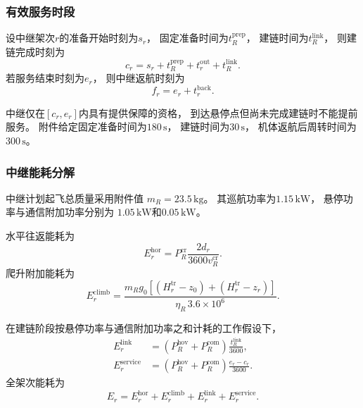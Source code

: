 \documentclass[bwprint]{gmcmthesis}
\begin{document}
\subsubsection{有效服务时段}

设中继架次$r$的准备开始时刻为$s_r$，
固定准备时间为$t_R^{\mathrm{prep}}$，
建链时间为$t_R^{\mathrm{link}}$，
则建链完成时刻为
\begin{equation}
    c_r
    =
    s_r+t_R^{\mathrm{prep}}
    +t_r^{\mathrm{out}}
    +t_R^{\mathrm{link}}.
\end{equation}
若服务结束时刻为$e_r$，
则中继返航时刻为
\begin{equation}
    f_r=e_r+t_r^{\mathrm{back}}.
\end{equation}

中继仅在$[c_r,e_r]$内具有提供保障的资格，
到达悬停点但尚未完成建链时不能提前服务。
附件给定固定准备时间为$180\,\mathrm{s}$，
建链时间为$30\,\mathrm{s}$，
机体返航后周转时间为$300\,\mathrm{s}$。

\subsubsection{中继能耗分解}

中继计划起飞总质量采用附件值
$m_R=23.5\,\mathrm{kg}$。
其巡航功率为$1.15\,\mathrm{kW}$，
悬停功率与通信附加功率分别为
$1.05\,\mathrm{kW}$和$0.05\,\mathrm{kW}$。

水平往返能耗为
\begin{equation}
    E_r^{\mathrm{hor}}
    =
    P_R^{\mathrm{cr}}
    \frac{2d_r}{3600v_R^{\mathrm{cr}}}.
\end{equation}
爬升附加能耗为
\begin{equation}
    E_r^{\mathrm{climb}}
    =
    \frac{
    m_Rg_0
    \left[
    (H_r^{\mathrm{tr}}-z_0)
    +(H_r^{\mathrm{tr}}-z_r)
    \right]
    }{\eta_R\,3.6\times10^6}.
\end{equation}

在建链阶段按悬停功率与通信附加功率之和计耗的工作假设下，
\begin{align}
    E_r^{\mathrm{link}}
    &=
    (P_R^{\mathrm{hov}}+P_R^{\mathrm{com}})
    \frac{t_R^{\mathrm{link}}}{3600},\\
    E_r^{\mathrm{service}}
    &=
    (P_R^{\mathrm{hov}}+P_R^{\mathrm{com}})
    \frac{e_r-c_r}{3600}.
\end{align}
全架次能耗为
\begin{equation}
    E_r
    =
    E_r^{\mathrm{hor}}
    +E_r^{\mathrm{climb}}
    +E_r^{\mathrm{link}}
    +E_r^{\mathrm{service}}.
\end{equation}
\end{document}
